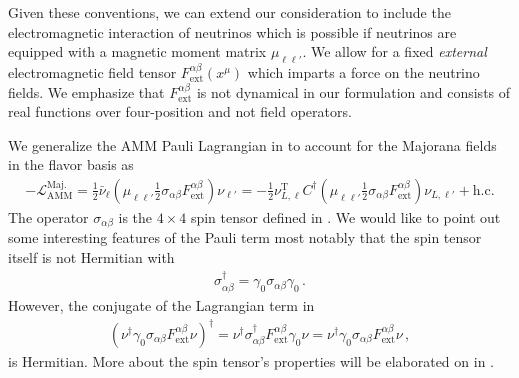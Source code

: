 Given these conventions, we can extend our consideration to include the electromagnetic interaction of neutrinos which is possible if neutrinos are equipped with a magnetic moment matrix $\mu_{\ell\ell'}$. We allow for a fixed \emph{external} electromagnetic field tensor $F^{\alpha\beta}_\mathrm{ext}(x^{\mu})$ which imparts a force on the neutrino fields. We emphasize that $F^{\alpha\beta}_\mathrm{ext}$ is not dynamical in our formulation and consists of real functions over four-position and not field operators.

We generalize the AMM Pauli Lagrangian in  to account for the Majorana fields in the flavor basis as
\begin{align}
\label{moment:1}
    -\mathcal{L}_{\mathrm{AMM}}^\mathrm{Maj.}=\frac{1}{2}\bar\nu_{\ell}\left(\mu_{\ell\ell'}\frac{1}{2}\sigma_{\alpha\beta}F^{\alpha\beta}_\mathrm{ext}\right)\nu_{\ell'}=
    -\frac{1}{2}\nu_{L,\ell}^\mathrm{T}C^{\dag}\left(\mu_{\ell\ell'}\frac{1}{2}\sigma_{\alpha\beta}F^{\alpha\beta}_\mathrm{ext}\right)\nu_{L,\ell'}+\mathrm{h.c.}
\end{align}
The operator $\sigma_{\alpha\beta}$ is the $4\times 4$ spin tensor defined in . We would like to point out some interesting features of the Pauli term most notably that the spin tensor itself is not Hermitian with
\begin{align}
\label{notherm:1}
\sigma_{\alpha\beta}^{\dag} = \gamma_{0}\sigma_{\alpha\beta}\gamma_{0}\,.
\end{align}
However, the conjugate of the Lagrangian term in 
\begin{align}
\left(\nu^{\dag}\gamma_{0}\sigma_{\alpha\beta}F^{\alpha\beta}_\mathrm{ext}\nu\right)^{\dag} = \nu^{\dag}\sigma_{\alpha\beta}^{\dag}F^{\alpha\beta}_\mathrm{ext}\gamma_{0}\nu = \nu^{\dag}\gamma_{0}\sigma_{\alpha\beta}F^{\alpha\beta}_\mathrm{ext}\nu\,,
\end{align}
is Hermitian. More about the spin tensor's properties will be elaborated on in .

